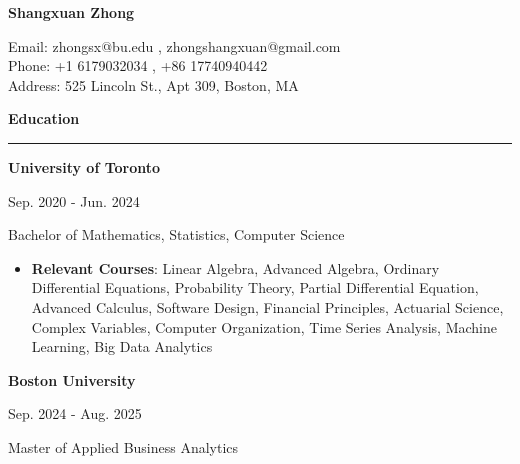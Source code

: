 \documentclass[
  16,
]{article}
\author{}
\date{}
\providecommand{\tightlist}{%
  \setlength{\itemsep}{0pt}\setlength{\parskip}{0pt}}\usepackage{longtable,booktabs,array}
\begin{document}
\begin{huge}\begin{center}{\bf Shangxuan Zhong}\end{center}\end{huge}

\begin{center}Email: zhongsx@bu.edu , zhongshangxuan@gmail.com \\
Phone: +1 6179032034 , +86 17740940442 \\
Address:  525 Lincoln St., Apt 309, Boston, MA \\
\end{center}
\vspace{15pt}

\begin{large}
  {\bf Education}
  \vspace{3pt}
  \hrule
  \begin{multicols}{2}
    \begin{flushleft}{\bf University of Toronto}\end{flushleft}
    \begin{flushright}Sep. 2020 - Jun. 2024\end{flushright}
  \end{multicols}
  \vspace{-0.17cm}
  \begin{multicols}{2}
    \begin{flushleft}Bachelor of Mathematics, Statistics, Computer Science\end{flushleft}
  \end{multicols}
  \vspace{-0.20cm}
\end{large}

\begin{itemize}
\tightlist
\item
  \textbf{Relevant Courses}: Linear Algebra, Advanced Algebra, Ordinary
  Differential Equations, Probability Theory, Partial Differential
  Equation, Advanced Calculus, Software Design, Financial Principles,
  Actuarial Science, Complex Variables, Computer Organization, Time
  Series Analysis, Machine Learning, Big Data Analytics
\end{itemize}

\vspace{0.2cm}

\begin{large}
  \begin{multicols}{2}
    \begin{flushleft}{\bf Boston University}\end{flushleft}
    \begin{flushright}Sep. 2024 - Aug. 2025\end{flushright}
  \end{multicols}
  \vspace{-0.17cm}
  \begin{multicols}{2}
    \begin{flushleft}Master of Applied Business Analytics\end{flushleft}
  \end{multicols}
  \vspace{-0.20cm}
\end{large}
\end{document}
